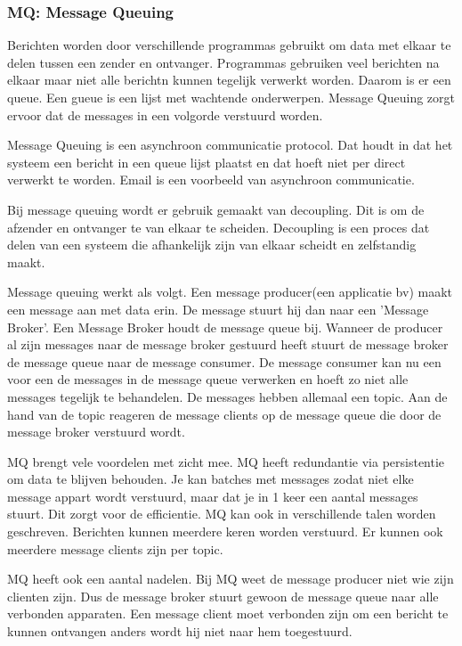 \documentclass{article}
\begin{document}
\subsubsection{MQ: Message Queuing}
Berichten worden door verschillende programmas gebruikt
om data met elkaar te delen tussen een zender en ontvanger.
Programmas gebruiken veel berichten na elkaar maar niet
alle berichtn kunnen tegelijk verwerkt worden.
Daarom is er een queue. Een gueue is een lijst met wachtende onderwerpen.
Message Queuing zorgt ervoor dat de messages in een volgorde verstuurd worden.

Message Queuing is een asynchroon communicatie protocol.
Dat houdt in dat het systeem een bericht in een queue lijst plaatst
en dat hoeft niet per direct verwerkt te worden.
Email is een voorbeeld van asynchroon communicatie.

Bij message queuing wordt er gebruik gemaakt van decoupling.
Dit is om de afzender en ontvanger te van elkaar te scheiden.
Decoupling is een proces dat delen van een systeem die afhankelijk
zijn van elkaar scheidt en zelfstandig maakt.

Message queuing werkt als volgt.
Een message producer(een applicatie bv) maakt een message aan met data erin.
De message stuurt hij dan naar een 'Message Broker'.
Een Message Broker houdt de message queue bij.
Wanneer de producer al zijn messages naar de message broker
gestuurd heeft stuurt de message broker de message queue naar
de message consumer.
De message consumer kan nu een voor een de messages in de message queue
verwerken en hoeft zo niet alle messages tegelijk te behandelen.
De messages hebben allemaal een topic.
Aan de hand van de topic reageren de message clients op de message queue die
door de message broker verstuurd wordt.


MQ brengt vele voordelen met zicht mee.
MQ heeft redundantie via persistentie om data te blijven behouden.
Je kan batches met messages zodat niet elke message appart wordt
verstuurd, maar dat je in 1 keer een aantal messages stuurt.
Dit zorgt voor de efficientie.
MQ kan ook in verschillende talen worden geschreven.
Berichten kunnen meerdere keren worden verstuurd.
Er kunnen ook meerdere message clients zijn per topic.

MQ heeft ook een aantal nadelen.
Bij MQ weet de message producer niet wie zijn clienten zijn.
Dus de message broker stuurt gewoon de message queue naar alle verbonden apparaten.
Een message client moet verbonden zijn om een bericht te kunnen ontvangen
anders wordt hij niet naar hem toegestuurd.
\end{document}
